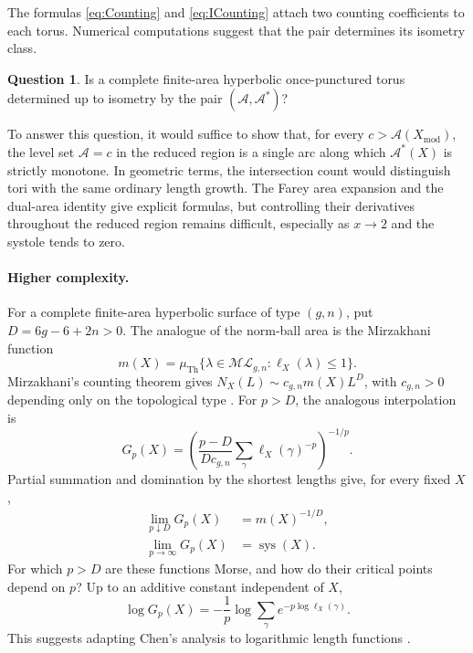 \documentclass[10pt,twoside]{article}
\theoremstyle{plain}
\theoremstyle{definition}
\newtheorem{question}[theorem]{Question}
\theoremstyle{remark}
\DeclareMathOperator{\sys}{sys}
\newcommand{\A}{\mathcal A}
\newcommand{\Xmod}{X_{\mathrm{mod}}}
\begin{document}
The formulas \eqref{eq:Counting} and \eqref{eq:ICounting} attach two
counting coefficients to each torus. Numerical computations
suggest that the pair determines its isometry class.
\begin{question}\label{conj:area-rigidity}
Is a complete finite-area hyperbolic once-punctured torus determined
up to isometry by the pair $(\A,\mathcal A^*)$?
\end{question}
To answer this question, it would suffice to show that, for every
$c>\A(\Xmod)$, the level set $\A=c$ in the reduced region is a single
arc along which $\mathcal A^*(X)$ is strictly monotone.
In geometric terms, the intersection count would distinguish tori
with the same ordinary length growth. The Farey area expansion and
the dual-area identity give explicit formulas, but controlling their
derivatives throughout the reduced region remains difficult,
especially as $x\to2$ and the systole tends to zero.

\paragraph{Higher complexity.}
For a complete finite-area hyperbolic surface of type $(g,n)$,
put $D=6g-6+2n>0$. The analogue of the norm-ball area is
the Mirzakhani function
$$
m(X)=\mu_{\mathrm{Th}}
\{\lambda\in\mathcal{ML}_{g,n}:\ell_X(\lambda)\leq1\}.
$$
Mirzakhani's counting theorem gives
$N_X(L)\sim c_{g,n}m(X)L^D$, with $c_{g,n}>0$ depending only
on the topological type \cite{MirzakhaniGrowth}.
For $p>D$, the analogous interpolation is
$$
G_p(X)=
\left(
\frac{p-D}{D c_{g,n}}
\sum_\gamma\ell_X(\gamma)^{-p}
\right)^{-1/p}.
$$
Partial summation and domination by the shortest
lengths give, for every fixed $X$,
$$
\begin{aligned}
\lim_{p\downarrow D}G_p(X)&=m(X)^{-1/D},\\
\lim_{p\to\infty}G_p(X)&=\sys(X).
\end{aligned}
$$
For which $p>D$ are these functions Morse, and how do their
critical points depend on $p$?
Up to an additive constant independent of $X$,
$$
\log G_p(X)
=-\frac1p\log\sum_\gamma e^{-p\log\ell_X(\gamma)}.
$$
This suggests adapting Chen's analysis to logarithmic length
functions \cite{Chen2025Morse}.
\end{document}
